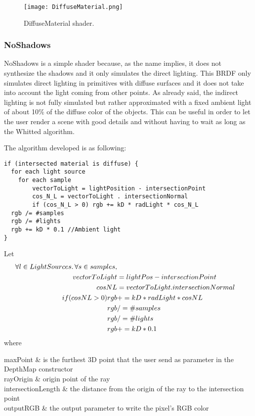 \begin{figure}[H]
	\centering
	\caption{DiffuseMaterial shader.}
	\label{DiffuseMaterial shader.}
	\texttt{[image: DiffuseMaterial.png]}
\end{figure}


\subsubsection{NoShadows}

\par
NoShadows is a simple shader because, as the name implies, it does not synthesize the shadows and it only simulates the direct lighting.
This BRDF only simulates direct lighting in primitives with diffuse surfaces and it does not take into account the light coming from other points.
As already said, the indirect lighting is not fully simulated but rather approximated with a fixed ambient light of about 10\% of the diffuse color of the objects.
This can be useful in order to let the user render a scene with good details and without having to wait as long as the Whitted algorithm.

\par
The algorithm developed is as following:

\begin{lstlisting}[caption={Algorithm of NoShadows Shader}, captionpos=b, label=NoShadows]
if (intersected material is diffuse) {
  for each light source
  	for each sample
	    vectorToLight = lightPosition - intersectionPoint
	    cos_N_L = vectorToLight . intersectionNormal
	    if (cos_N_L > 0) rgb += kD * radLight * cos_N_L
  rgb /= #samples
  rgb /= #lights
  rgb += kD * 0.1 //Ambient light
}
\end{lstlisting}

Let
\begin{equation}
\label{NoShadowsAlgorithm}
\begin{aligned}
\forall{l \in LightSources \ldotp \forall s \in samples},\\
vectorToLight & = lightPos - intersectionPoint \\
cosNL & = vectorToLight . intersectionNormal \\
if (cosNL > 0) rgb & += kD * radLight * cosNL \\
rgb & /= \#samples \\
rgb & /= \#lights \\
rgb & += kD * 0.1 \\
\end{aligned}
\end{equation}
where
\begin{conditions*}
	maxPoint & is the furthest 3D point that the user send as parameter in the DepthMap constructor \\
	rayOrigin & origin point of the ray \\
	intersectionLength & the distance from the origin of the ray to the intersection point  \\
	outputRGB & the output parameter to write the pixel's RGB color \\
\end{conditions*}

